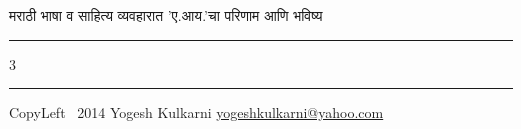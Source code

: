\documentclass[12pt,landscape]{article}
\begin{document}
\begin{center}
     \Large{मराठी भाषा व साहित्य व्यवहारात 'ए.आय.'चा परिणाम आणि भविष्य }  %
\end{center}
\rule{\linewidth}{0.25pt}
\raggedright
\footnotesize
\begin{multicols}{3}


\rule{0.3\linewidth}{0.25pt}

\scriptsize
CopyLeft \textcopyleft\ 2014 Yogesh Kulkarni
\href{http://www.yogeshkulkarni.com}{yogeshkulkarni@yahoo.com}

\end{multicols}
\end{document}

